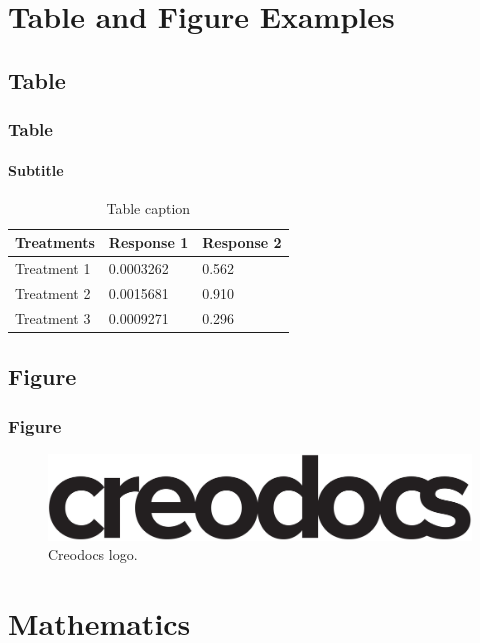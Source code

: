 \documentclass[
	10pt, %
]{beamer}
\begin{document}

\section{Table and Figure Examples}

\subsection{Table}

\begin{frame}
	\frametitle{Table}
	\framesubtitle{Subtitle} %

	\begin{table}
		\begin{tabular}{l l l}
			\toprule
			\textbf{Treatments} & \textbf{Response 1} & \textbf{Response 2}\\
			\midrule
			Treatment 1 & 0.0003262 & 0.562 \\
			Treatment 2 & 0.0015681 & 0.910 \\
			Treatment 3 & 0.0009271 & 0.296 \\
			\bottomrule
		\end{tabular}
		\caption{Table caption}
	\end{table}
\end{frame}


\subsection{Figure}

\begin{frame}
	\frametitle{Figure}

	\begin{figure}
		\includegraphics[width=0.8\linewidth]{creodocs_logo.pdf}
		\caption{Creodocs logo.}
	\end{figure}
\end{frame}


\section{Mathematics}
\end{document}
